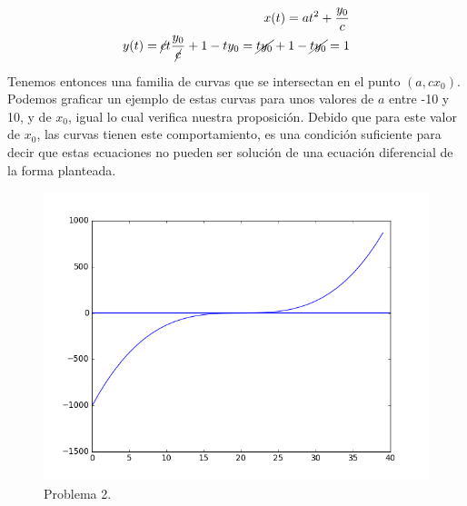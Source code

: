 \documentclass[a4paper,10pt]{article}
\begin{document}
\begin{align}
 \begin{split}
  x(t) =  at^2 + \frac{y_0}{c} \\
  y(t) = \cancel{c} t \frac{y_0}{\cancel{c}} + 1 - t y_0 = 
  \cancel{t y_0} + 1 -\cancel{t y_0} = 1
  \label{eq:ec1prob2}
 \end{split}
\end{align}

Tenemos entonces una familia de curvas que se intersectan en el punto $(a,cx_0)$. Podemos
graficar un ejemplo de estas curvas para unos valores de $a$ entre -10 y 10, y de $x_0$, igual
lo cual verifica nuestra proposición. Debido que para este valor de $x_0$, las curvas tienen
este comportamiento, es una condición suficiente para decir que estas ecuaciones no pueden
ser solución de una ecuación diferencial de la forma planteada.

\begin{figure}[h!]
 \centering
\includegraphics[scale=0.3]{problema2fig1}
\caption{Problema 2.}
\label{fig:problema2fig1}
\end{figure}



\vspace{.3cm}

\newpage
\end{document}
